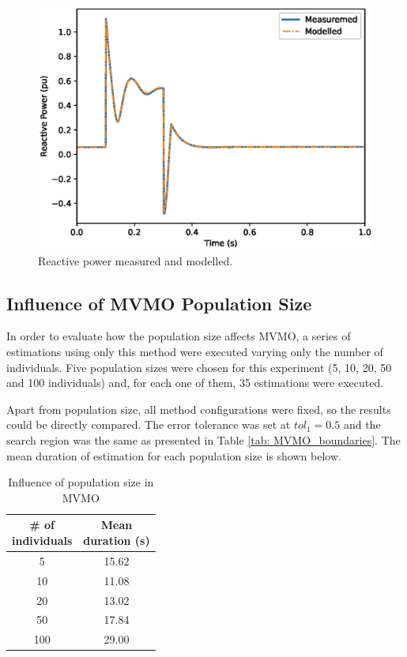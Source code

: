 \begin{figure}[h]
	\centering
	\includegraphics[scale=0.7]{Images/Q_compared.eps}
	\caption{Reactive power measured and modelled.}		
	\label{fig: output_Q}
\end{figure}

\subsection{Influence of MVMO Population Size}

In order to evaluate how the population size affects MVMO, a series of estimations using only this method were executed varying only the number of individuals. Five population sizes were chosen for this experiment (5, 10, 20, 50 and 100 individuals) and, for each one of them, 35 estimations were executed.

Apart from population size, all method configurations were fixed, so the results could be directly compared. The error tolerance was set at $tol_{1} = 0.5$ and the search region was the same as presented in Table \ref{tab: MVMO_boundaries}. The mean duration of estimation for each population size is shown below.

\begin{table}[h]
	\centering
	\begin{tabular}{c|c}
		\shortstack{\# of \\ individuals} & \shortstack{Mean \\ duration (s)} \\\hline
		5 & 15.62 \\
		10 & 11.08 \\
		20 & 13.02 \\
		50 & 17.84 \\
		100 & 29.00 
	\end{tabular}
	\caption{Influence of population size in MVMO}
	\label{tab: pop_size}
\end{table}

